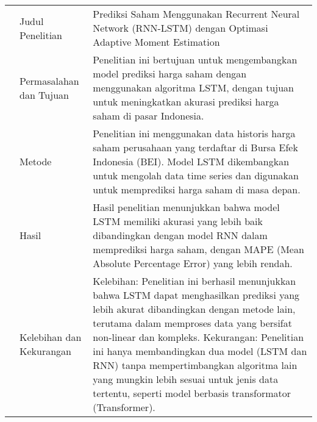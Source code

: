 \begin{center}
\begin{longtable}{| m{1cm} | m{3cm}| p{8cm} |}
		\cline{2-3}
		                                   & Judul Penelitian                       & Prediksi Saham Menggunakan Recurrent Neural Network (RNN-LSTM) dengan Optimasi Adaptive Moment Estimation                                                                                                                                                                                                                                                                                                                                     \\
		\cline{2-3}
		                                   & Permasalahan dan Tujuan                & Penelitian ini bertujuan untuk mengembangkan model prediksi harga saham dengan menggunakan algoritma LSTM, dengan tujuan untuk meningkatkan akurasi prediksi harga saham di pasar Indonesia.                                                                                                                                                                                                                                                  \\
		\cline{2-3}
		                                   & Metode                                 & Penelitian ini menggunakan data historis harga saham perusahaan yang terdaftar di Bursa Efek Indonesia (BEI). Model LSTM dikembangkan untuk mengolah data time series dan digunakan untuk memprediksi harga saham di masa depan.                                                                                                                                                                                                              \\
		\cline{2-3}
		                                   & Hasil                                  & Hasil penelitian menunjukkan bahwa model LSTM memiliki akurasi yang lebih baik dibandingkan dengan model RNN dalam memprediksi harga saham, dengan MAPE (Mean Absolute Percentage Error) yang lebih rendah.                                                                                                                                                                                                                                   \\
		\cline{2-3}
		                                   & Kelebihan dan Kekurangan               & Kelebihan: Penelitian ini berhasil menunjukkan bahwa LSTM dapat menghasilkan prediksi yang lebih akurat dibandingkan dengan metode lain, terutama dalam memproses data yang bersifat non-linear dan kompleks. \newline Kekurangan: Penelitian ini hanya membandingkan dua model (LSTM dan RNN) tanpa mempertimbangkan algoritma lain yang mungkin lebih sesuai untuk jenis data tertentu, seperti model berbasis transformator (Transformer). \\


\end{longtable}
\end{center}
